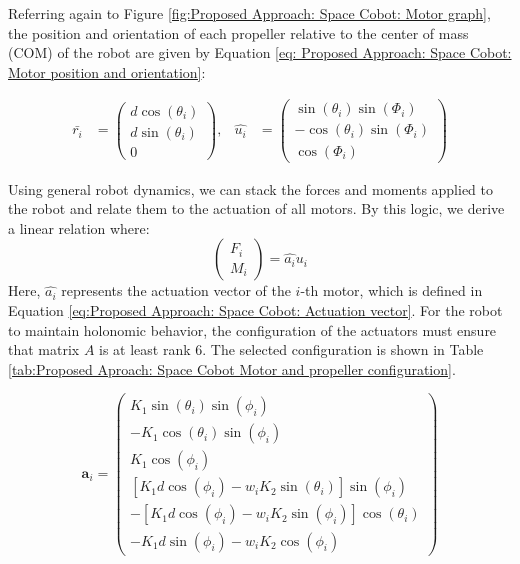 Referring again to Figure \ref{fig:Proposed Approach: Space Cobot: Motor graph}, the position and orientation of each propeller relative to the center of mass (COM) of the robot are given by Equation \ref{eq: Proposed Approach: Space Cobot: Motor position and orientation}:

\begin{align}
    \bar{r_{i}} &= \begin{pmatrix}
        d \cos(\theta_{i}) \\ 
        d \sin(\theta_{i}) \\
        0
    \end{pmatrix}, &
    \hat{u_{i}} &= \begin{pmatrix}
        \sin(\theta_{i}) \sin(\Phi_{i}) \\
        -\cos(\theta_{i}) \sin(\Phi_{i}) \\
        \cos(\Phi_{i})
    \end{pmatrix}
    \label{eq: Proposed Approach: Space Cobot: Motor position and orientation}
\end{align}

Using general robot dynamics, we can stack the forces and moments applied to the robot and relate them to the actuation of all motors. By this logic, we derive a linear relation where:
\[
\begin{pmatrix} F_{i} \\ M_{i}  \end{pmatrix} = \hat{a_{i}} u_{i}
\]
Here, \(\hat{a_i}\) represents the actuation vector of the \(i\)-th motor, which is defined in Equation \ref{eq:Proposed Approach: Space Cobot: Actuation vector}. For the robot to maintain holonomic behavior, the configuration of the actuators must ensure that matrix \(A\) is at least rank 6. The selected configuration is shown in Table \ref{tab:Proposed Aproach: Space Cobot Motor and propeller configuration}.

\begin{equation}
\mathbf{a}_i = 
\begin{pmatrix}
K_1 \sin(\theta_i) \sin(\phi_i) \\
-K_1 \cos(\theta_i) \sin(\phi_i) \\
K_1 \cos(\phi_i) \\
[K_1 d \cos(\phi_i) - w_i K_2 \sin(\theta_i)] \sin(\phi_i) \\
-[K_1 d \cos(\phi_i) - w_i K_2 \sin(\phi_i)] \cos(\theta_i) \\
-K_1 d \sin(\phi_i) - w_i K_2 \cos(\phi_i)
\end{pmatrix}
\label{eq:Proposed Approach: Space Cobot: Actuation vector}
\end{equation}

